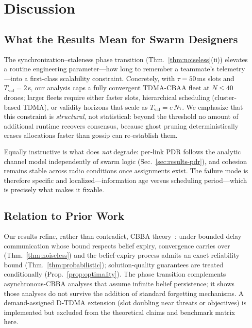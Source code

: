 \section{Discussion}\label{sec:discussion}

\subsection{What the Results Mean for Swarm Designers}
The synchronization--staleness phase transition (Thm.~\ref{thm:noiseless}(ii)) elevates a routine engineering parameter---how long to remember a teammate's telemetry---into a first-class scalability constraint.
Concretely, with $\tau = 50$\,ms slots and $T_{\mathrm{val}} = 2$\,s, our analysis caps a fully convergent TDMA-CBAA fleet at $N \leq 40$ drones; larger fleets require either faster slots, hierarchical scheduling (cluster-based TDMA), or validity horizons that scale as $T_{\mathrm{val}} = c\,N\tau$.
We emphasize that this constraint is \emph{structural}, not statistical: beyond the threshold no amount of additional runtime recovers consensus, because ghost pruning deterministically erases allocations faster than gossip can re-establish them.

Equally instructive is what does \emph{not} degrade: per-link PDR follows the analytic channel model independently of swarm logic (Sec.~\ref{sec:results-pdr}), and cohesion remains stable across radio conditions once assignments exist.
The failure mode is therefore specific and localized---information age versus scheduling period---which is precisely what makes it fixable.

\subsection{Relation to Prior Work}
Our results refine, rather than contradict, CBBA theory~\cite{choi2009}: under bounded-delay communication whose bound respects belief expiry, convergence carries over (Thm.~\ref{thm:noiseless}) and the belief-expiry process admits an exact reliability bound (Thm.~\ref{thm:probabilistic}); solution-quality guarantees are treated conditionally (Prop.~\ref{prop:optimality}).
The phase transition complements asynchronous-CBBA analyses that assume infinite belief persistence; it shows those analyses do not survive the addition of standard forgetting mechanisms.
A demand-assigned D-TDMA extension (slot doubling near threats or objectives) is implemented but excluded from the theoretical claims and benchmark matrix here.


